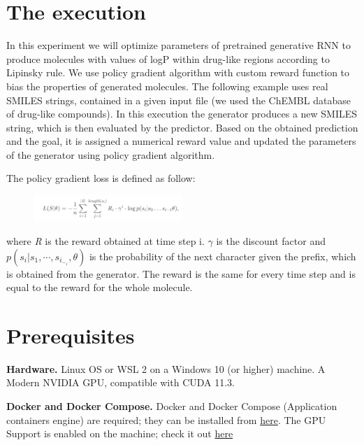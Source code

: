 \documentclass[conference]{IEEEtran}
\newcommand{\mypar}[1]{{\bf #1.}}
\begin{document}
\section{The execution}\label{sec:The execution}

In this experiment we will optimize parameters of pretrained generative RNN to produce molecules with values of logP within drug-like regions according to Lipinsky rule. We use policy gradient algorithm with custom reward function to bias the properties of generated molecules.
The following example uses real SMILES strings, contained in a given input file (we used the ChEMBL database of drug-like compounds).
In this execution the generator produces a new SMILES string, which is then evaluated by the predictor. Based on the obtained prediction and the goal, it is assigned a numerical reward value and updated the parameters of the generator using policy gradient algorithm.
 
The policy gradient loss is defined as follow:

\begin{figure}[htbp]
		\centering
			\includegraphics[width=0.50\textwidth]{formula.png}
		\label{fig:formula}
	\end{figure}

where \textit{R} is the reward obtained at time step i. \begin{math}\gamma\end{math} is the discount factor and \begin{math} p(s_i | s_1,\cdots ,s_i_-_1,\theta) \end{math} is the probability of the next character given the prefix, which is obtained from the generator. The reward is the same for every time step and is equal to the reward for the whole molecule. 

\section{Prerequisites}\label{sec:Prerequisites}

\mypar{Hardware}
Linux OS or WSL 2 on a Windows 10 (or higher) machine.
A Modern NVIDIA GPU, compatible with CUDA 11.3.

\mypar{Docker and Docker Compose}
Docker and Docker Compose (Application containers engine) are required; they can be installed from \href{https://www.docker.com}{here}.
The GPU Support is enabled on the machine; check it out \href{https://docs.docker.com/compose/gpu-support/}{here} 
\end{document}
